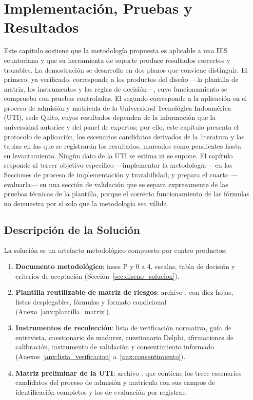 \chapter{Implementación, Pruebas y Resultados}
\label{chap:implementacion}

Este capítulo sostiene que la metodología propuesta es aplicable a una IES ecuatoriana y que su herramienta de soporte produce resultados correctos y trazables. La demostración se desarrolla en dos planos que conviene distinguir. El primero, ya verificado, corresponde a los productos del diseño ---la plantilla de matriz, los instrumentos y las reglas de decisión---, cuyo funcionamiento se comprueba con pruebas controladas. El segundo corresponde a la aplicación en el proceso de admisión y matrícula de la Universidad Tecnológica Indoamérica (UTI), sede Quito, cuyos resultados dependen de la información que la universidad autorice y del panel de expertos; por ello, este capítulo presenta el protocolo de aplicación, los escenarios candidatos derivados de la literatura y las tablas en las que se registrarán los resultados, marcados como pendientes hasta su levantamiento. Ningún dato de la UTI se estima ni se supone. El capítulo responde al tercer objetivo específico ---implementar la metodología--- en las Secciones de proceso de implementación y trazabilidad, y prepara el cuarto ---evaluarla--- en una sección de validación que se separa expresamente de las pruebas técnicas de la plantilla, porque el correcto funcionamiento de las fórmulas no demuestra por sí solo que la metodología sea válida.

\section{Descripción de la Solución}

La solución es un artefacto metodológico compuesto por cuatro productos:

\begin{enumerate}
  \item \textbf{Documento metodológico}: fases P y 0 a 4, escalas, tabla de decisión y criterios de aceptación (Sección~\ref{sec:diseno_solucion}).
  \item \textbf{Plantilla reutilizable de matriz de riesgos}: archivo , con diez hojas, listas desplegables, fórmulas y formato condicional (Anexo~\ref{anx:plantilla_matriz}).
  \item \textbf{Instrumentos de recolección}: lista de verificación normativa, guía de entrevista, cuestionario de madurez, cuestionario Delphi, afirmaciones de calibración, instrumento de validación y consentimiento informado (Anexos~\ref{anx:lista_verificacion} a~\ref{anx:consentimiento}).
  \item \textbf{Matriz preliminar de la UTI}: archivo , que contiene los trece escenarios candidatos del proceso de admisión y matrícula con sus campos de identificación completos y los de evaluación por registrar.
\end{enumerate}

